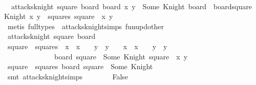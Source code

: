 \begin{isabellebody}
\ \ \ \ \ \ \ \ \isamarkupfalse%
\ {\isacartoucheopen}{\isasymnot}\ attacks{\isacharunderscore}knight\ square\ board{\isacartoucheclose}\ {\isacartoucheopen}board{\isacharprime}\ {\isacharparenleft}x{\isacharprime}{\isacharcomma}\ y{\isacharprime}{\isacharparenright}\ {\isacharequal}\ Some\ Knight{\isacartoucheclose}\ {\isacartoucheopen}board{\isacharprime}\ {\isacharequal}\ board{\isacharparenleft}square{\isacharprime}\ {\isasymmapsto}\ Knight{\isacharparenright}{\isacartoucheclose}\ {\isacartoucheopen}{\isacharparenleft}x{\isacharprime}{\isacharcomma}\ y{\isacharprime}{\isacharparenright}\ {\isasymin}\ squares{\isacartoucheclose}\ {\isacartoucheopen}square\ {\isacharequal}\ {\isacharparenleft}x{\isacharcomma}\ y{\isacharparenright}{\isacartoucheclose}\isanewline
\ \ \ \ \ \ \ \ \isamarkupfalse%
\ {\isacharparenleft}metis\ {\isacharparenleft}full{\isacharunderscore}types{\isacharparenright}\ \ attacks{\isacharunderscore}knight{\isachardot}simps\ fun{\isacharunderscore}upd{\isacharunderscore}other{\isacharparenright}\isanewline
\ \ \ \ \ \ \isamarkupfalse%
\ {\isachardoublequoteopen}attacks{\isacharunderscore}knight\ square{\isacharprime}\ board{\isachardoublequoteclose}\isanewline
\ \ \ \ \ \ \ \ \isamarkupfalse%
\ {\isacharbackquoteopen}square{\isacharprime}\ {\isasymin}\ squares{\isacharbackquoteclose}\ \ {\isacartoucheopen}{\isasymbar}x\ {\isacharminus}\ x{\isacharprime}{\isasymbar}\ {\isacharequal}\ {}\ {\isasymand}\ {\isasymbar}y\ {\isacharminus}\ y{\isacharprime}{\isasymbar}\ {\isacharequal}\ {}\ {\isasymor}\ {\isasymbar}x\ {\isacharminus}\ x{\isacharprime}{\isasymbar}\ {\isacharequal}\ {}\ {\isasymand}\ {\isasymbar}y\ {\isacharminus}\ y{\isacharprime}{\isasymbar}\ {\isacharequal}\ {}{\isacartoucheclose}\isanewline
\ \ \ \ \ \ \ \ \ \ \ \ \ \ {\isacharbackquoteopen}board\ square\ {\isacharequal}\ Some\ Knight{\isacharbackquoteclose}\ {\isacharbackquoteopen}square\ {\isacharequal}\ {\isacharparenleft}x{\isacharcomma}\ y{\isacharparenright}{\isacharbackquoteclose}\isanewline
\ \ \ \ \ \ \ \ \isamarkupfalse%
\ {\isacharbackquoteopen}square\ {\isasymin}\ squares{\isacharbackquoteclose}\ {\isacharbackquoteopen}board\ square\ {\isacharequal}\ Some\ Knight{\isacharbackquoteclose}\isanewline
\ \ \ \ \ \ \ \ \isamarkupfalse%
\ {\isacharparenleft}smt\ attacks{\isacharunderscore}knight{\isachardot}simps{\isacharparenright}\isanewline
\ \ \ \ \ \ \isamarkupfalse%
\ False\isanewline
\ \ \ \ \ \ \ \ \isamarkupfalse%

\end{isabellebody}
